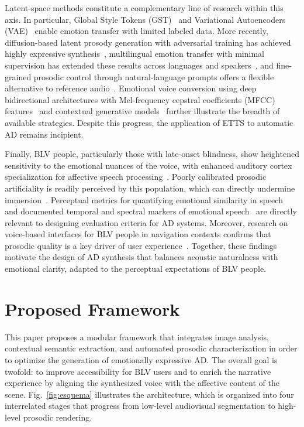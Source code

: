 \documentclass[pdflatex,iicol,sn-mathphys-num]{sn-jnl}%
\theoremstyle{thmstyleone}%
\theoremstyle{thmstyletwo}%
\theoremstyle{thmstylethree}%
\begin{document}
Latent-space methods constitute a complementary line of research within this axis. In particular, Global Style Tokens (GST)~\cite{Wu2019,Wang2018} and Variational Autoencoders (VAE)~\cite{Zhang2018} enable emotion transfer with limited labeled data. More recently, diffusion-based latent prosody generation with adversarial training has achieved highly expressive synthesis~\cite{Oh2024}, multilingual emotion transfer with minimal supervision has extended these results across languages and speakers~\cite{Zhu2023}, and fine-grained prosodic control through natural-language prompts offers a flexible alternative to reference audio~\cite{Bott2024}. Emotional voice conversion using deep bidirectional architectures with Mel-frequency cepstral coefficients (MFCC) features~\cite{Cao2024} and contextual generative models~\cite{Porco2023} further illustrate the breadth of available strategies. Despite this progress, the application of ETTS to automatic AD remains incipient.

Finally, BLV people, particularly those with late-onset blindness, show heightened sensitivity to the emotional nuances of the voice, with enhanced auditory cortex specialization for affective speech processing~\cite{Ben-David2024,Liu2024a}. Poorly calibrated prosodic artificiality is readily perceived by this population, which can directly undermine immersion~\cite{Sarzedas2024,Nussbaum2023}. Perceptual metrics for quantifying emotional similarity in speech~\cite{Harvill2023} and documented temporal and spectral markers of emotional speech~\cite{Kurazhova2024} are directly relevant to designing evaluation criteria for AD systems. Moreover, research on voice-based interfaces for BLV people in navigation contexts confirms that prosodic quality is a key driver of user experience~\cite{Yucel2025}. Together, these findings motivate the design of AD synthesis that balances acoustic naturalness with emotional clarity, adapted to the perceptual expectations of BLV people.

\section{Proposed Framework}
\label{sec:framework}

This paper proposes a modular framework that integrates image analysis, contextual semantic extraction, and automated prosodic characterization in order to optimize the generation of emotionally expressive AD. The overall goal is twofold: to improve accessibility for BLV users and to enrich the narrative experience by aligning the synthesized voice with the affective content of the scene. Fig.~\ref{fig:esquema} illustrates the architecture, which is organized into four interrelated stages that progress from low-level audiovisual segmentation to high-level prosodic rendering.
\end{document}
